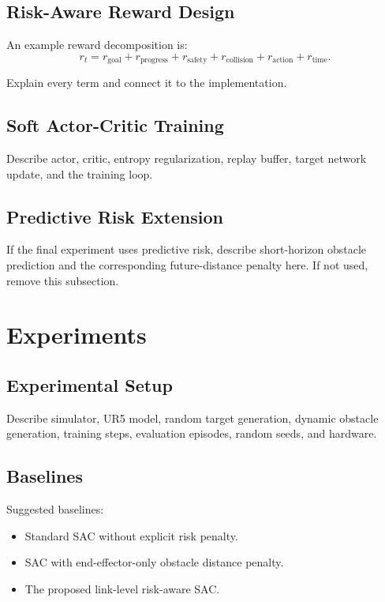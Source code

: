 \documentclass{ieeeaccess}
\begin{document}
\subsection{Risk-Aware Reward Design}
An example reward decomposition is:
\begin{equation}
    r_t = r_{\mathrm{goal}} + r_{\mathrm{progress}} + r_{\mathrm{safety}} + r_{\mathrm{collision}} + r_{\mathrm{action}} + r_{\mathrm{time}}.
\end{equation}

Explain every term and connect it to the implementation.

\subsection{Soft Actor-Critic Training}
Describe actor, critic, entropy regularization, replay buffer, target network update, and the training loop.

\subsection{Predictive Risk Extension}
If the final experiment uses predictive risk, describe short-horizon obstacle prediction and the corresponding future-distance penalty here.
If not used, remove this subsection.

\section{Experiments}
\label{sec:experiments}

\subsection{Experimental Setup}
Describe simulator, UR5 model, random target generation, dynamic obstacle generation, training steps, evaluation episodes, random seeds, and hardware.

\subsection{Baselines}
Suggested baselines:
\begin{itemize}
    \item Standard SAC without explicit risk penalty.
    \item SAC with end-effector-only obstacle distance penalty.
    \item The proposed link-level risk-aware SAC.
\end{itemize}
\end{document}
